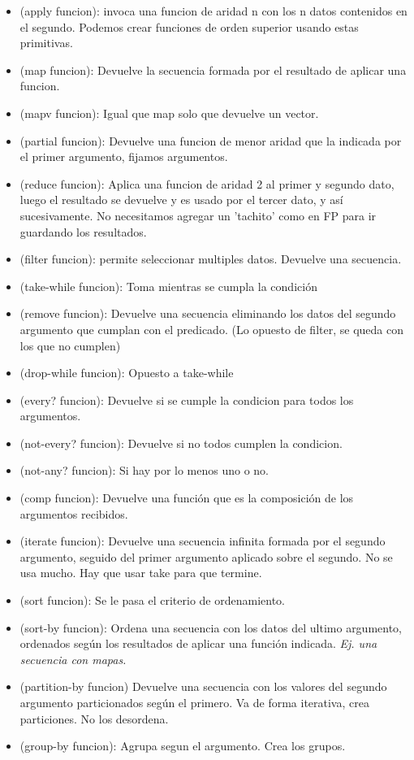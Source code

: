 \begin{itemize}
    \item (apply funcion): invoca una funcion de aridad n con los n datos contenidos en el segundo. Podemos crear funciones de orden superior usando estas primitivas.
    \item (map funcion): Devuelve la secuencia formada por el resultado de aplicar una funcion.
    \item (mapv funcion): Igual que map solo que devuelve un vector.
    \item (partial funcion): Devuelve una funcion de menor aridad que la indicada por el primer argumento, fijamos argumentos.
    \item (reduce funcion): Aplica una funcion de aridad 2 al primer y segundo dato, luego el resultado se devuelve y es usado por el tercer dato, y así sucesivamente. No necesitamos agregar un 'tachito' como en FP para ir guardando los resultados.
    \item (filter funcion): permite seleccionar multiples datos. Devuelve una secuencia.
    \item (take-while funcion): Toma mientras se cumpla la condición
    \item (remove funcion): Devuelve una secuencia eliminando los datos del segundo argumento que cumplan con el predicado. (Lo opuesto de filter, se queda con los que no cumplen)
    \item (drop-while funcion): Opuesto a take-while
    \item (every? funcion): Devuelve si se cumple la condicion para todos los argumentos.
    \item (not-every? funcion): Devuelve si no todos cumplen la condicion.
    \item (not-any? funcion): Si hay por lo menos uno o no.
    \item (comp funcion): Devuelve una función que es la composición de los argumentos recibidos.
    \item (iterate funcion): Devuelve una secuencia infinita formada por el segundo argumento, seguido del primer argumento aplicado sobre el segundo. No se usa mucho. Hay que usar take para que termine.
    \item (sort funcion): Se le pasa el criterio de ordenamiento.
    \item (sort-by funcion): Ordena una secuencia con los datos del ultimo argumento, ordenados según los resultados de aplicar una función indicada. \textit{Ej. una secuencia con mapas.}
    \item (partition-by funcion) Devuelve una secuencia con los valores del segundo argumento particionados según el primero. Va de forma iterativa, crea particiones. No los desordena.
    \item (group-by funcion): Agrupa segun el argumento. Crea los grupos.
\end{itemize}


